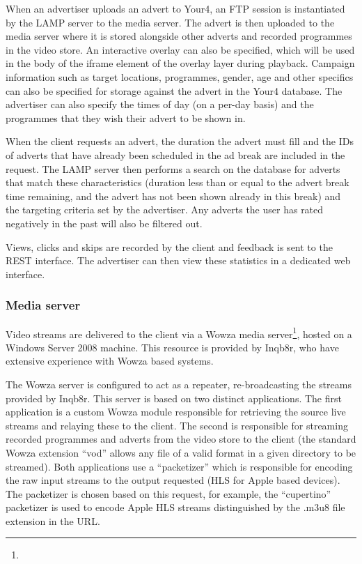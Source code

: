 When an advertiser uploads an advert to Your4, an FTP session is instantiated by the LAMP server to the media server. The advert is then uploaded to the media server where it is stored alongside other adverts and recorded programmes in the video store. An interactive overlay can also be specified, which will be used in the body of the iframe element of the overlay layer during playback. Campaign information such as target locations, programmes, gender, age and other specifics can also be specified for storage against the advert in the Your4 database. The advertiser can also specify the times of day (on a per-day basis) and the programmes that they wish their advert to be shown in.

When the client requests an advert, the duration the advert must fill and the IDs of adverts that have already been scheduled in the ad break are included in the request. The LAMP server then performs a search on the database for adverts that match these characteristics (duration less than or equal to the advert break time remaining, and the advert has not been shown already in this break) and the targeting criteria set by the advertiser. Any adverts the user has rated negatively in the past will also be filtered out.

Views, clicks and skips are recorded by the client and feedback is sent to the REST interface. The advertiser can then view these statistics in a dedicated web interface.

\subsubsection{Media server}

Video streams are delivered to the client via a Wowza media server\footnote{}, hosted on a Windows Server 2008 machine. This resource is provided by Inqb8r, who have extensive experience with Wowza based systems.

The Wowza server is configured to act as a repeater, re-broadcasting the streams provided by Inqb8r. This server is based on two distinct applications. The first application is a custom Wowza module responsible for retrieving the source live streams and relaying these to the client. The second is responsible for streaming recorded programmes and adverts from the video store to the client (the standard Wowza extension ``vod'' allows any file of a valid format in a given directory to be streamed). Both applications use a ``packetizer'' which is responsible for encoding the raw input streams to the output requested (HLS for Apple based devices). The packetizer is chosen based on this request, for example, the ``cupertino'' packetizer is used to encode Apple HLS streams distinguished by the .m3u8 file extension in the URL.


